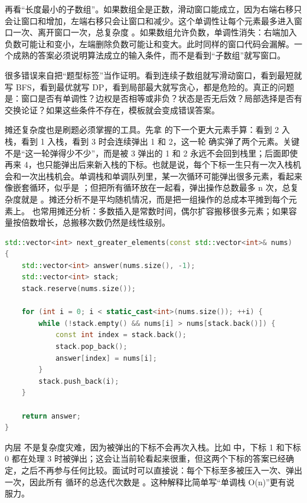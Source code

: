 再看“长度最小的子数组”。如果数组全是正数，滑动窗口能成立，因为右端右移只会让窗口和增加，左端右移只会让窗口和减少。这个单调性让每个元素最多进入窗口一次、离开窗口一次，总复杂度 。如果数组允许负数，单调性消失：右端加入负数可能让和变小，左端删除负数可能让和变大。此时同样的窗口代码会漏解。一个成熟的答案必须说明算法成立的输入条件，而不是看到“子数组”就写窗口。

\begin{warningbox}
很多错误来自把“题型标签”当作证明。看到连续子数组就写滑动窗口，看到最短就写 BFS，看到最优就写 DP，看到局部最大就写贪心，都是危险的。真正的问题是：窗口是否有单调性？边权是否相等或非负？状态是否无后效？局部选择是否有交换论证？如果这些条件不存在，模板就会变成错误答案。
\end{warningbox}

摊还复杂度也是刷题必须掌握的工具。先拿 \code{[2, 1, 3]} 的下一个更大元素手算：看到 2 入栈，看到 1 入栈，看到 3 时会连续弹出 1 和 2，这一轮  确实弹了两个元素。关键不是“这一轮弹得少不少”，而是被 3 弹出的 1 和 2 永远不会回到栈里；后面即使再来 4，也只能弹出后来新入栈的下标。也就是说，每个下标一生只有一次入栈机会和一次出栈机会。单调栈和单调队列里，某一次循环可能弹出很多元素，看起来像嵌套循环，似乎是 ；但把所有循环放在一起看，弹出操作总数最多 n 次，总复杂度就是 。摊还分析不是平均随机情况，而是把一组操作的总成本平摊到每个元素上。  也常用摊还分析：多数插入是常数时间，偶尔扩容搬移很多元素；如果容量按倍数增长，总搬移次数仍然是线性级别。

\begin{lstlisting}[language=C++,caption={单调栈摊还分析的代码形态}]
std::vector<int> next_greater_elements(const std::vector<int>& nums)
{
    std::vector<int> answer(nums.size(), -1);
    std::vector<int> stack;
    stack.reserve(nums.size());

    for (int i = 0; i < static_cast<int>(nums.size()); ++i) {
        while (!stack.empty() && nums[i] > nums[stack.back()]) {
            const int index = stack.back();
            stack.pop_back();
            answer[index] = nums[i];
        }
        stack.push_back(i);
    }

    return answer;
}
\end{lstlisting}

内层  不是复杂度灾难，因为被弹出的下标不会再次入栈。比如  中，下标 1 和下标 0 都在处理 3 时被弹出；这会让当前轮看起来很重，但这两个下标的答案已经确定，之后不再参与任何比较。面试时可以直接说：每个下标至多被压入一次、弹出一次，因此所有  循环的总迭代次数是 。这种解释比简单写“单调栈 O(n)”更有说服力。

